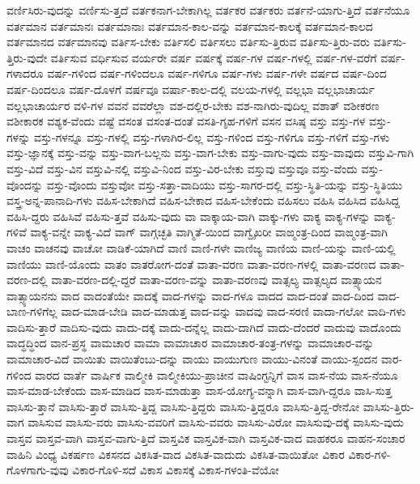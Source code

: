 {ವರ್ಣಿಸಿರು-ವುದನ್ನು
ವರ್ಣಿಸು-ತ್ತದೆ
ವರ್ತಕನಾಗ-ಬೇಕಾಗಿಲ್ಲ
ವರ್ತಕರ
ವರ್ತಕರು
ವರ್ತನೆ-ಯಾಗು-ತ್ತಿದೆ
ವರ್ತನೆಯೂ
ವರ್ತಮಾನ
ವರ್ತಮಾನಃ
ವರ್ತಮಾನಾಃ
ವರ್ತಮಾನ-ಕಾಲ-ವನ್ನು
ವರ್ತಮಾನ-ಕಾಲಕ್ಕೆ
ವರ್ತಮಾನ-ಕಾಲದ
ವರ್ತಮಾನದ
ವರ್ತಮಾನವು
ವರ್ತಿಸ-ಬೇಕು
ವರ್ತಿಸಲಿ
ವರ್ತಿಸಲು
ವರ್ತಿಸು-ತ್ತಿರುವ
ವರ್ತಿಸು-ತ್ತಿರು-ವರು
ವರ್ತಿಸು-ತ್ತಿರು-ವುದೇ
ವರ್ತಿಸುವ
ವರ್ಧಿಸುವ
ವರ್ಯರೇ
ವರ್ಷ
ವರ್ಷಕ್ಕೆ
ವರ್ಷ-ಗಳ
ವರ್ಷ-ಗಳಲ್ಲಿ
ವರ್ಷ-ಗಳ-ವರೆಗೆ
ವರ್ಷ-ಗಳಾದರೂ
ವರ್ಷ-ಗಳಿಂದ
ವರ್ಷ-ಗಳಿಂದಲೂ
ವರ್ಷ-ಗಳಿಗೂ
ವರ್ಷ-ಗಳು
ವರ್ಷ-ಗಳೇ
ವರ್ಷದ
ವರ್ಷ-ದಿಂದ
ವರ್ಷ-ದಿಂದಲೂ
ವರ್ಷ-ದೊಳಗೆ
ವರ್ಷವೂ
ವರ್ಷಾ-ಕಾಲ-ದಲ್ಲಿ
ವಲಯ-ಗಳಲ್ಲಿ
ವಲ್ಲಭಾ
ವಲ್ಲಭಾಚಾರ್ಯ
ವಲ್ಲಭಾಚಾರ್ಯರ
ವಳಿ-ಗಳ
ವವನೆ
ವವರೆಲ್ಲಾ
ವಶ-ದಲ್ಲಿರ-ಬೇಕು
ವಶ-ನಾಗಿರು-ವುದಿಲ್ಲ
ವಶಾತ್
ವಶೀಕರಣ
ವಶೀಕಾರಕ
ವಶ್ಯಕ-ವೆಂದು
ವಷ್ಟೆ
ವಸಂತ
ವಸಂತ-ದಂತೆ
ವಸತಿ-ಗೃಹ-ಗಳಿಗೆ
ವಸನ
ವಸಿಷ್ಠ
ವಸ್ತು
ವಸ್ತು-ಗಳ
ವಸ್ತು-ಗಳನ್ನು
ವಸ್ತು-ಗಳನ್ನೂ
ವಸ್ತು-ಗಳಲ್ಲಿ
ವಸ್ತು-ಗಳಾಗಿರ-ಲಿಲ್ಲ
ವಸ್ತು-ಗಳಿಂದ
ವಸ್ತು-ಗಳಿಗೂ
ವಸ್ತು-ಗಳಿಗೆ
ವಸ್ತು-ಗಳು
ವಸ್ತು-ಜ್ಞಾನಕ್ಕೆ
ವಸ್ತು-ವನ್ನು
ವಸ್ತು-ವಾಗ-ಬಲ್ಲನು
ವಸ್ತು-ವಾಗ-ಬೇಕು
ವಸ್ತು-ವಾಗು-ವುದು
ವಸ್ತು-ವಾವುದು
ವಸ್ತುವಿ-ಗಾಗಿ
ವಸ್ತು-ವಿದೆ
ವಸ್ತು-ವಿನ
ವಸ್ತುವಿ-ನಲ್ಲಿ
ವಸ್ತುವಿ-ನಿಂದ
ವಸ್ತು-ವಿರ-ಬೇಕು
ವಸ್ತುವು
ವಸ್ತುವೂ
ವಸ್ತು-ವೆಂದು
ವಸ್ತು-ವೊಂದನ್ನು
ವಸ್ತು-ವೊಂದು
ವಸ್ತುವೋ
ವಸ್ತು-ಸತ್ತಾ-ವಾದಿಯು
ವಸ್ತು-ಸಾಗರ-ದಲ್ಲಿ
ವಸ್ತು-ಸ್ಥಿತಿ-ಯನ್ನು
ವಸ್ತು-ಸ್ಥಿತಿಯು
ವಸ್ತ್ರ-ಅನ್ನ-ಪಾನಾದಿ-ಗಳು
ವಹಿಸ-ಬೇಕಾಗಿದೆ
ವಹಿಸ-ಬೇಕಾದ
ವಹಿಸ-ಬೇಕೆಂದು
ವಹಿಸಲು
ವಹಿಸಿ
ವಹಿಸಿದ
ವಹಿಸಿದ್ದ
ವಹಿಸಿ-ದ್ದರು
ವಹಿಸಿವೆ
ವಹಿಸು-ತ್ತವೆ
ವಹಿಸು-ವುದು
ವಾ
ವಾಕ್ಕಾಯ-ವಾಗಿ
ವಾಕ್ಕು-ಗಳು
ವಾಕ್ಯ
ವಾಕ್ಯ-ಗಳನ್ನು
ವಾಕ್ಯ-ಗಳಿವೆ
ವಾಕ್ಯ-ವನ್ನೇ
ವಾಕ್ಯ-ವಿದೆ
ವಾಗ್
ವಾಗ್ಗಚ್ಛತಿ
ವಾಗ್ಮಿತೆ-ಯಿಂದ
ವಾಗ್ವೈಖರೀ
ವಾಙ್ಮಂತ್ರ-ದಿಂದ
ವಾಙ್ಮಂತ್ರ-ವಾಗಿ
ವಾಚಂ
ವಾಚನವು
ವಾಚೋ
ವಾಡಿಕೆ-ಯಾಗಿದೆ
ವಾಣಿ
ವಾಣಿ-ಗಳೇ
ವಾಣಿಜ್ಯ
ವಾಣಿಯ
ವಾಣಿ-ಯನ್ನು
ವಾಣಿ-ಯಲ್ಲಿ
ವಾಣಿಯು
ವಾಣಿ-ಯೊಂದು
ವಾತಂ
ವಾತರೋಗ-ದಂತೆ
ವಾತಾ-ವರಣ
ವಾತಾ-ವರಣ-ಗಳಲ್ಲಿ
ವಾತಾ-ವರಣದ
ವಾತಾ-ವರಣ-ದಲ್ಲಿ
ವಾತಾ-ವರಣ-ದಲ್ಲಿ-ದ್ದರೆ
ವಾತಾ-ವರಣ-ವನ್ನು
ವಾತಾ-ವರಣವು
ವಾತ್ಸಲ್ಯ
ವಾತ್ಸಲ್ಯದ
ವಾತ್ಸ್ಯಾಯನ
ವಾತ್ಸ್ಯಾಯನನು
ವಾದ
ವಾದಂತೆಯೇ
ವಾದಕ್ಕೆ
ವಾದ-ಗಳನ್ನು
ವಾದ-ಗಳೂ
ವಾದದ
ವಾದ-ದಂತೆ
ವಾದ-ದಿಂದ
ವಾದ-ಬಾಣ-ಗಳಿಗೆಲ್ಲ
ವಾದ-ಮಾಡ-ಬೇಡಿ
ವಾದ-ಮಾಡುತ್ತ
ವಾದ-ವನ್ನು
ವಾದವು
ವಾದ-ಸರಣಿ
ವಾದಾ-ಗಲೋ
ವಾದಿ-ಗಳು
ವಾದಿಸು-ತ್ತಾರೆ
ವಾದಿಸು-ವುದು
ವಾದು-ದಕ್ಕೆ
ವಾದು-ದನ್ನೆಲ್ಲ
ವಾದು-ದಾಗಿದೆ
ವಾದು-ದೆಂದರೆ
ವಾದುವು
ವಾದೊಂದು
ವಾದ್ಧದ್ಧಿಂದ
ವಾನ-ಪ್ರಸ್ಥ
ವಾಮಚಾರ
ವಾಮಾ
ವಾಮಾಚಾರ
ವಾಮಾಚಾರ-ತಂತ್ರ-ಗಳನ್ನು
ವಾಮಾಚಾರ-ವನ್ನು
ವಾಮಾಚಾರ-ವಿದೆ
ವಾಯಿತು
ವಾಯಿತೆಂಬು-ದನ್ನು
ವಾಯು
ವಾಯುಗುಣ
ವಾಯು-ವಿನಂತೆ
ವಾಯು-ಸ್ಪಂದನ
ವಾರ-ಗಳಿಂದ
ವಾರದ
ವಾರ್ತೆ
ವಾರ್ಷಿಕ
ವಾಲ್ಮೀಕಿ
ವಾಲ್ಮೀಕಿಯು-ಪ್ರಾಚೀನ
ವಾಷಿಂಗ್ಟನ್ನಿಗೆ
ವಾಸ
ವಾಸ-ನೆಯ
ವಾಸ-ನೆಯೂ
ವಾಸ-ಮಾಡ-ಬೇಕೆಂದು
ವಾಸ-ಮಾಡಿದ
ವಾಸ-ಮಾಡುತ್ತಾ
ವಾಸ-ಯೋಗ್ಯ-ವನ್ನಾಗಿ
ವಾಸ-ವಾಗಿ-ದ್ದರೂ
ವಾಸಿ-ಸುತ್ತ
ವಾಸಿಸು-ತ್ತಾನೆ
ವಾಸಿಸು-ತ್ತಾರೆ
ವಾಸಿಸು-ತ್ತಿದ್ದ
ವಾಸಿಸು-ತ್ತಿದ್ದರು
ವಾಸಿಸು-ತ್ತಿದ್ದರೂ
ವಾಸಿಸು-ತ್ತಿದ್ದ-ರೇನೋ
ವಾಸಿಸು-ತ್ತಿರು-ವಾಗ
ವಾಸಿಸುವ
ವಾಸಿಸು-ವರು
ವಾಸಿಸು-ವವರಿಗೆ
ವಾಸಿಸು-ವವರು
ವಾಸಿಸು-ವಿರೋ
ವಾಸಿಸುವು-ದಕ್ಕೆ
ವಾಸಿಸು-ವುದು
ವಾಸ್ತವ
ವಾಸ್ತವ-ವಾಗಿ
ವಾಸ್ತವ-ವಾಗು-ತ್ತಿದೆ
ವಾಸ್ತವಿಕ
ವಾಸ್ತವಿಕ-ವಾಗಿ
ವಾಸ್ತವಿಕ-ವಾದ
ವಾಹಕರೂ
ವಾಹನ-ಸಂಚಾರ
ವಾಹಿನಿ
ವಿಂಧ್ಯ
ವಿಕರ್ಷಣ
ವಿಕಸನದ
ವಿಕಸಿತ-ವಾದ
ವಿಕಸಿತ-ವಾದುದು
ವಿಕಸಿತ-ವಾಯಿತೋ
ವಿಕಾರ
ವಿಕಾರ-ಗಳಿ-ಗೊಳಗಾಗು-ವುವು
ವಿಕಾರ-ಗೊಳಿ-ಸದೆ
ವಿಕಾಸ
ವಿಕಾಸಕ್ಕೆ
ವಿಕಾಸ-ಗಳಂತಿ-ವೆಯೋ
}
